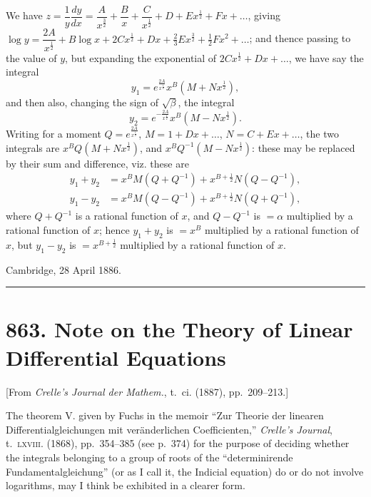 \documentclass[11pt,a4paper]{article}
\theoremstyle{definition}
\begin{document}
We have $z = \dfrac{1}{y}\dfrac{dy}{dx} = \dfrac{A}{x^{\frac{3}{2}}} + \dfrac{B}{x} + \dfrac{C}{x^{\frac{1}{2}}} + D + Ex^{\frac{1}{2}} + Fx + \ldots$, giving $\log y = \dfrac{2A}{x^{\frac{1}{2}}} + B\log x + 2Cx^{\frac{1}{2}} + Dx + \tfrac{2}{3}Ex^{\frac{3}{2}} + \tfrac{1}{2}Fx^2 + \ldots$; and thence passing to the value of $y$, but expanding the exponential of $2Cx^{\frac{1}{2}} + Dx + \ldots$, we have say the integral
\[
y_1 = e^{\frac{2A}{x^{\frac{1}{2}}}} x^B (M + Nx^{\frac{1}{2}}),
\]
and then also, changing the sign of $\sqrt{\beta}$, the integral
\[
y_2 = e^{-\frac{2A}{x^{\frac{1}{2}}}} x^B (M - Nx^{\frac{1}{2}}).
\]
Writing for a moment $Q = e^{\frac{2A}{x^{\frac{1}{2}}}}$, $M = 1 + Dx + \ldots$, $N = C + Ex + \ldots$, the two integrals are $x^B Q(M + Nx^{\frac{1}{2}})$, and $x^B Q^{-1}(M - Nx^{\frac{1}{2}})$: these may be replaced by their sum and difference, viz. these are
\begin{align*}
y_1 + y_2 &= x^B M(Q + Q^{-1}) + x^{B + \frac{1}{2}} N(Q - Q^{-1}), \\
y_1 - y_2 &= x^B M(Q - Q^{-1}) + x^{B + \frac{1}{2}} N(Q + Q^{-1}),
\end{align*}
where $Q + Q^{-1}$ is a rational function of $x$, and $Q - Q^{-1}$ is $= \alpha$ multiplied by a rational function of $x$; hence $y_1 + y_2$ is $= x^B$ multiplied by a rational function of $x$, but $y_1 - y_2$ is $= x^{B + \frac{1}{2}}$ multiplied by a rational function of $x$.

\begin{flushright}
Cambridge, 28 April 1886.
\end{flushright}

\vspace{12pt}
\hrule
\vspace{12pt}

\section*{863. Note on the Theory of Linear Differential Equations}

\begin{center}
[From \textit{Crelle's Journal der Mathem.}, t.~ci. (1887), pp.~209--213.]
\end{center}

The theorem V. given by Fuchs in the memoir ``Zur Theorie der linearen Differentialgleichungen mit ver\"anderlichen Coefficienten,'' \textit{Crelle's Journal}, t.~\textsc{lxviii}. (1868), pp.~354--385 (see p.~374) for the purpose of deciding whether the integrals belonging to a group of roots of the ``determinirende Fundamentalgleichung'' (or as I call it, the Indicial equation) do or do not involve logarithms, may I think be exhibited in a clearer form.
\end{document}
